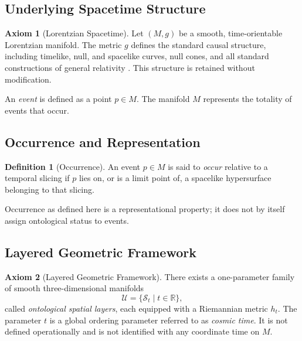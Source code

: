\documentclass[11pt,a4paper]{article}
\theoremstyle{plain}
\theoremstyle{definition}
\newtheorem{axiom}{Axiom}
\newtheorem{definition}{Definition}
\theoremstyle{remark}
\begin{document}
\subsection{Underlying Spacetime Structure}

\begin{axiom}[Lorentzian Spacetime]
Let $(M,g)$ be a smooth, time-orientable Lorentzian manifold. The metric $g$ defines the standard causal structure, including timelike, null, and spacelike curves, null cones, and all standard constructions of general relativity \cite{Hawking1973,Wald1984}. This structure is retained without modification.
\end{axiom}

An \emph{event} is defined as a point $p\in M$. The manifold $M$ represents the totality of events that occur.

\subsection{Occurrence and Representation}

\begin{definition}[Occurrence]
An event $p\in M$ is said to \emph{occur} relative to a temporal slicing if $p$ lies on, or is a limit point of, a spacelike hypersurface belonging to that slicing.
\end{definition}

Occurrence as defined here is a representational property; it does not by itself assign ontological status to events.

\subsection{Layered Geometric Framework}

\begin{axiom}[Layered Geometric Framework]
There exists a one-parameter family of smooth three-dimensional manifolds
\[
\mathcal{U}=\{\mathcal{S}_t \mid t\in\mathbb{R}\},
\]
called \emph{ontological spatial layers}, each equipped with a Riemannian metric $h_t$. The parameter $t$ is a global ordering parameter referred to as \emph{cosmic time}. It is not defined operationally and is not identified with any coordinate time on $M$.
\end{axiom}
\end{document}

